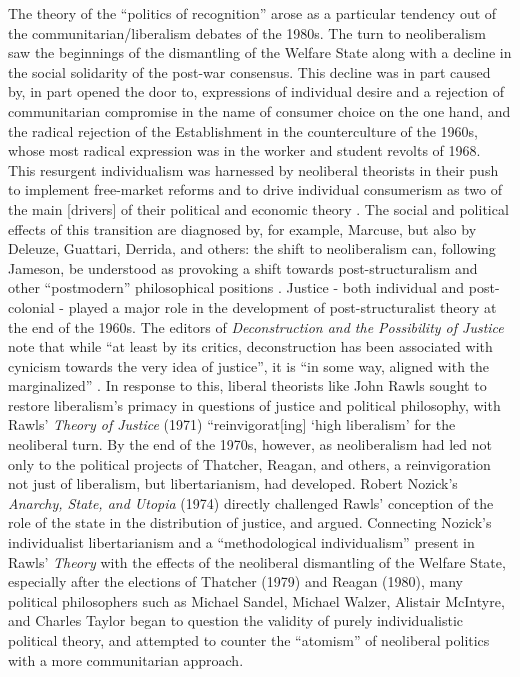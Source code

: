 \documentclass[12pt,oneside]{memoir}
\begin{document}
The theory of the ``politics of recognition'' arose as a particular tendency out of the communitarian/liberalism debates of the 1980s. The turn to neoliberalism saw the beginnings of the dismantling of the Welfare State along with a decline in the social solidarity of the post-war consensus. This decline was in part caused by, in part opened the door to, expressions of individual desire and a rejection of communitarian compromise in the name of consumer choice on the one hand, and the radical rejection of the Establishment in the counterculture of the 1960s, whose most radical expression was in the worker and student revolts of 1968. This resurgent individualism was harnessed by neoliberal theorists in their push to implement free-market reforms and to drive individual consumerism as two of the main [drivers] of their political and economic theory \citep{harvey-2005}. The social and political effects of this transition are diagnosed by, for example, Marcuse, but also by Deleuze, Guattari, Derrida, and others: the shift to neoliberalism can, following Jameson, be understood as provoking a shift towards post-structuralism and other ``postmodern'' philosophical positions \citep{Jameson1991}. Justice - both individual and post-colonial - played a major role in the development of post-structuralist theory at the end of the 1960s. The editors of \textit{Deconstruction and the Possibility of Justice }note that while ``at least by its critics, deconstruction has been associated with cynicism towards the very idea of justice'', it is ``in some way, aligned with the marginalized'' \citep[ix]{CornellRosenfeldCarleson1992}.
In response to this, liberal theorists like John Rawls sought to restore liberalism's primacy in questions of justice and political philosophy, with Rawls' \textit{Theory of Justice }(1971) ``reinvigorat[ing] `high liberalism' \citep[3]{Galisanka2019} for the neoliberal turn. By the end of the 1970s, however, as neoliberalism had led not only to the political projects of Thatcher, Reagan, and others, a reinvigoration not just of liberalism, but libertarianism, had developed. Robert Nozick's \textit{Anarchy, State, and Utopia} (1974) directly challenged Rawls' conception of the role of the state in the distribution of justice, and argued. Connecting Nozick's individualist libertarianism and a ``methodological individualism'' present in Rawls' \textit{Theory} with the effects of the neoliberal dismantling of the Welfare State, especially after the elections of Thatcher (1979) and Reagan (1980), many political philosophers such as Michael Sandel, Michael Walzer, Alistair McIntyre, and  Charles Taylor began to question the validity of purely individualistic political theory, and attempted to counter the ``atomism'' \citep{Taylor1985} of neoliberal politics with a more communitarian approach.
\end{document}
